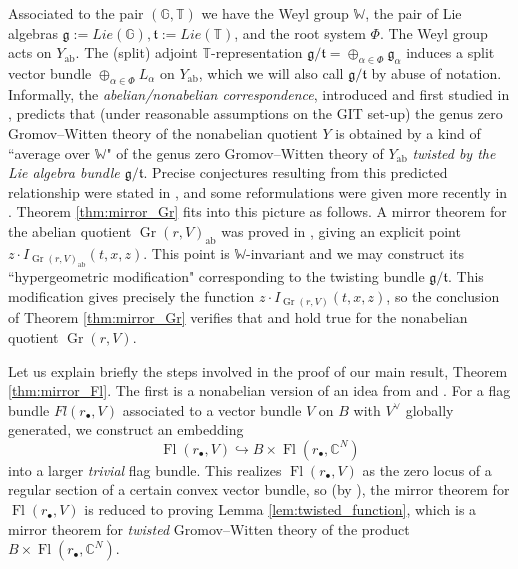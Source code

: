 \documentclass[a4paper,12pt]{amsart}
\numberwithin{equation}{section}
\theoremstyle{definition}
\newcommand{\C}{\mathbb{C}}
\newcommand{\G}{\mathbb{G}}
\newcommand{\T}{\mathbb{T}}
\newcommand{\W}{\mathbb{W}}
\newcommand{\Fl}{\operatorname{Fl}}
\newcommand{\Gr}{\operatorname{Gr}}
\begin{document}
Associated to the pair $(\G,\T)$ we have the Weyl group $\W$, the pair of Lie algebras $\mathfrak{g}:=Lie(\G), \mathfrak{t}:=Lie(\T)$, and the root system $\Phi$. The Weyl group acts on $Y_{\operatorname{ab}}$. The (split) adjoint $\T$-representation $\mathfrak{g}/\mathfrak{t}=\oplus_{\alpha\in\Phi}\mathfrak{g}_{\alpha}$ induces a split vector bundle $\oplus_{\alpha\in\Phi }L_{\alpha}$ on $Y_{\operatorname{ab}}$, which we will also call $\mathfrak{g}/\mathfrak{t}$ by abuse of notation. Informally, the \emph{abelian/nonabelian correspondence}, introduced and first studied in \cite{BCFK:ab/nonab,CFKS}, predicts that (under reasonable assumptions on the GIT set-up) the genus zero Gromov--Witten theory of the nonabelian quotient $Y$ is obtained by a kind of ``average over $\W$" of the genus zero Gromov--Witten theory of $Y_{\operatorname{ab}}$ \emph{twisted by the Lie algebra bundle $\mathfrak{g}/\mathfrak{t}$}. Precise conjectures resulting from this predicted relationship were stated in \cite{BCFK:ab/nonab,CFKS}, and some reformulations were given more recently in \cite{CLS}. Theorem \ref{thm:mirror_Gr} fits into this picture as follows.
A mirror theorem for the abelian quotient $\Gr(r,V)_{\operatorname{ab}}$ was proved in \cite[Theorem 5.1]{Koto:mirror}, giving an explicit point $z\cdot I_{\Gr(r,V)_{\operatorname{ab}}}(t,x,z)$. This point is $\W$-invariant and we may construct its ``hypergeometric modification" corresponding to the twisting bundle $\mathfrak{g}/\mathfrak{t}$. This modification gives precisely the function $z\cdot I_{\Gr(r,V)}(t,x,z)$, so the conclusion of Theorem \ref{thm:mirror_Gr} verifies that \cite[Conjecture 4.3]{BCFK:ab/nonab} and \cite[Conjecture 1.8]{CLS} hold true for the nonabelian quotient $\Gr(r,V)$. 

Let us explain briefly the steps involved in the proof of our main result, Theorem \ref{thm:mirror_Fl}. The first is a nonabelian version of an idea from \cite{IK:quantum} and \cite{Koto:mirror}. For a flag bundle $Fl(r_\bullet, V)$ associated to a vector bundle $V$ on $B$ with $V^\vee$ globally generated, we construct an embedding 
\[ 
\Fl(r_\bullet, V)\hookrightarrow B\times\Fl(r_\bullet, \C^N)
\]
into a larger {\em trivial} flag bundle. This realizes $\Fl(r_\bullet, V)$ as the zero locus of a regular section of a certain convex vector bundle, so (by \cite{KKP:functoriality}), the mirror theorem for $\Fl(r_\bullet, V)$ is reduced to proving Lemma \ref{lem:twisted_function}, which is a mirror theorem for {\em twisted} Gromov--Witten theory of the product $B\times\Fl(r_\bullet, \C^N)$.
\end{document}
